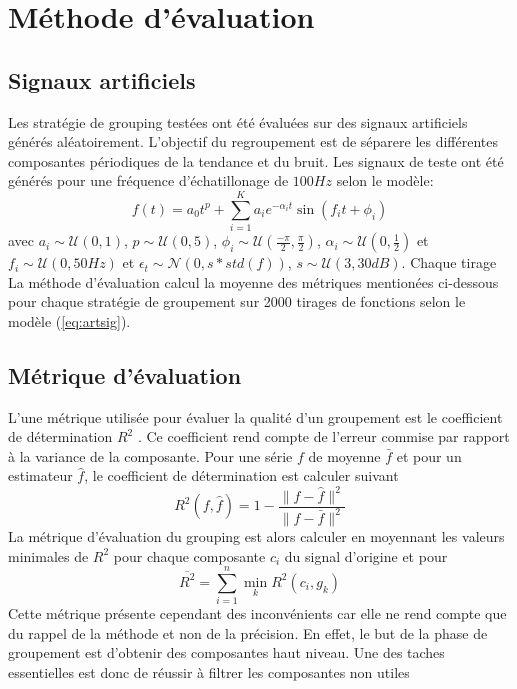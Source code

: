 \documentclass{gretsi}
\begin{document}

\section{Méthode d'évaluation}
\label{sec:eval}



\subsection{Signaux artificiels}
\label{sub:artsig}
    Les stratégie de grouping testées ont été évaluées sur des signaux artificiels générés aléatoirement. L'objectif du regroupement est de séparere les différentes composantes périodiques de la tendance et du bruit. Les signaux de teste ont été générés pour une fréquence d'échatillonage de $100Hz$ selon le modèle:
    \begin{equation}\label{eq:artsig}
    f(t) = a_0 t^p + \sum_{i=1}^K a_i e^{-\alpha_i t} \sin\left(f_i t + \phi_i\right)
    \end{equation} avec $a_i \sim \mathcal U(0, 1)$, $p \sim \mathcal U(0, 5)$, $\displaystyle \phi_i \sim \mathcal U\left(\frac{-\pi}{2}, \frac{\pi}{2}\right)$, $\alpha_i \sim \mathcal U\left(0, \frac{1}{2}\right)$ et $f_i \sim \mathcal U(0, 50Hz)$ et $\epsilon_t \sim \mathcal N(0, s*std(f))$, $s \sim \mathcal U(3, 30dB)$. Chaque tirage\\
    
     La méthode d'évaluation calcul la moyenne des métriques mentionées ci-dessous pour chaque stratégie de groupement sur 2000 tirages de fonctions selon le modèle (\ref{eq:artsig}).


\subsection{Métrique d'évaluation}
\label{sub:met}
L'une métrique utilisée pour évaluer la qualité d'un groupement est le coefficient de détermination $R^2$ \cite{abalov_14_auto}. Ce coefficient rend compte de l'erreur commise par rapport à la variance de la composante. Pour une série $f$ de moyenne $\bar f$ et pour un estimateur $\hat f$, le coefficient de détermination est calculer suivant$$
R^2(f, \hat f) = 1 - \frac{\|f-\hat f\|^2}{\|f-\bar f\|^2}
$$ La métrique d'évaluation du grouping est alors calculer  en moyennant les valeurs minimales de $R^2$ pour chaque composante $c_i$ du signal d'origine et pour $$
\overline{ R^2} = \sum_{i=1}^n \min_k R^2(c_i, g_k)
$$Cette métrique présente cependant des inconvénients car elle ne rend compte que du rappel de la méthode et non de la précision. En effet, le but de la phase de groupement est d'obtenir des composantes haut niveau. Une des taches essentielles est donc de réussir à filtrer les composantes non utiles
\end{document}
